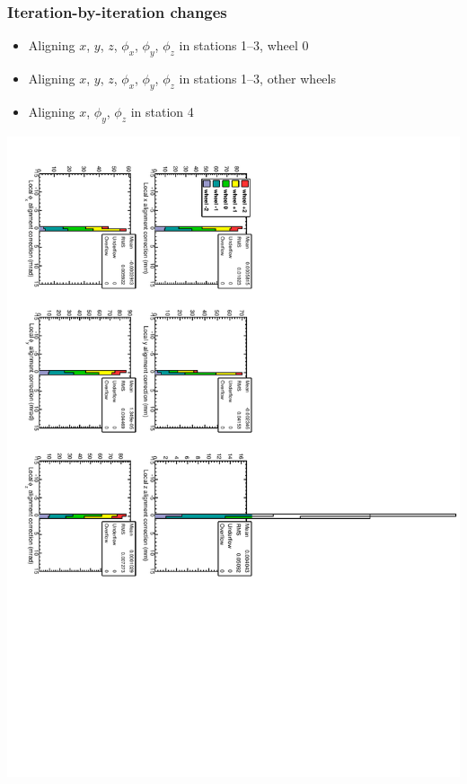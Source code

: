 \documentclass[compress]{beamer}
\begin{document}
\begin{frame}
\frametitle{Iteration-by-iteration changes}

\begin{itemize}
\item Aligning $x$, $y$, $z$, $\phi_x$, $\phi_y$, $\phi_z$ in stations 1--3, wheel 0
\item Aligning $x$, $y$, $z$, $\phi_x$, $\phi_y$, $\phi_z$ in stations 1--3, other wheels
\item Aligning $x$, $\phi_y$, $\phi_z$ in station 4
\end{itemize}

\vfill
\includegraphics[height=\linewidth, angle=90]{data_100GeV_newinternal_iter5.pdf}
\end{frame}
\end{document}
